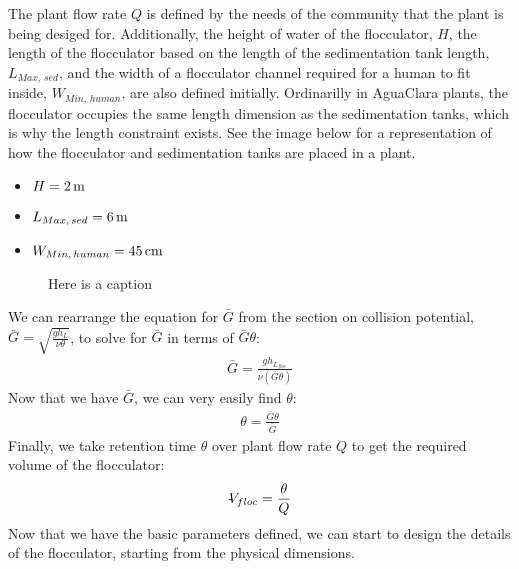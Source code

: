 \documentclass[letterpaper,10pt,english]{sphinxmanual}
\let\sphinxpxdimen\pdfpxdimen\else\newdimen\sphinxpxdimen
\begin{document}
The plant flow rate \(Q\) is defined by the needs of the community that the plant is being desiged for. Additionally, the height of water  of the flocculator, \(H\), the  length of the flocculator based on the length of the sedimentation tank length, \(L_{Max, \, sed}\), and the  width of a flocculator channel required for a human to fit inside, \(W_{Min, \, human}\), are also defined initially. Ordinarilly in AguaClara plants, the flocculator occupies the same length dimension as the sedimentation tanks, which is why the length constraint exists. See the image below for a representation of how the flocculator and sedimentation tanks are placed in a plant.
\begin{itemize}
\item {} 
\(H = 2 \, {\rm m}\)

\item {} 
\(L_{Max, \, sed} = 6 \, {\rm m}\)

\item {} 
\(W_{Min, \, human} = 45 \, {\rm cm}\)

\end{itemize}

\begin{figure}[htbp]
\centering
\capstart

\noindent\sphinxincludegraphics[width=300\sphinxpxdimen]{{Physical_design_criteria}.jpg}
\caption{Here is a caption}\label{\detokenize{Flocculation/Floc_Design:id8}}\label{\detokenize{Flocculation/Floc_Design:figure-physical-design-criteria}}\end{figure}


We can rearrange the equation for \(\bar G\) from the section on collision potential, \(\bar G = \sqrt{\frac{g h_L}{\nu \theta}}\), to solve for \(\bar G\) in terms of \(\bar G \theta\):
\begin{equation}\label{equation:Flocculation/Floc_Design:Flocculation/Floc_Design:22}
\begin{split}\bar G = \frac{g h_{L_{floc}}}{\nu (\bar G \theta)}\end{split}
\end{equation}
Now that we have \(\bar G\), we can very easily find \(\theta\):
\begin{equation}\label{equation:Flocculation/Floc_Design:Flocculation/Floc_Design:23}
\begin{split}\theta = \frac{\bar G \theta}{\bar G}\end{split}
\end{equation}
Finally, we take retention time \(\theta\) over plant flow rate \(Q\) to get the required volume of the flocculator:
\begin{equation}\label{equation:Flocculation/Floc_Design:Flocculation/Floc_Design:24}
\begin{split}\rlap{-} V_{floc} = \frac{\theta}{Q}\end{split}
\end{equation}
Now that we have the basic parameters defined, we can start to design the details of the flocculator, starting from the physical dimensions.
\end{document}
